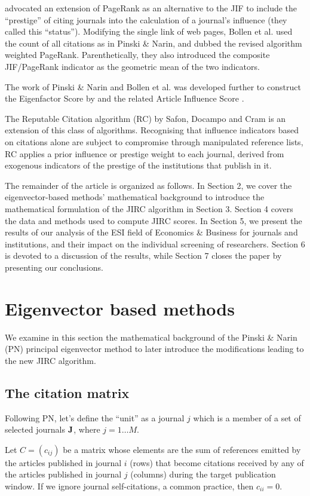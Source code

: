 \documentclass[10pt]{article}
\begin{document}
\cite{bollen} advocated an extension of PageRank as an alternative to
the JIF to include the “prestige” of citing journals into the calculation of a journal’s
influence (they called this “status”). Modifying the single link of web pages, Bollen et al.
used the count of all citations as in Pinski \& Narin, and dubbed the revised algorithm
weighted PageRank. Parenthetically, they also introduced the composite JIF/PageRank
indicator as the geometric mean of the two indicators.

The work of Pinski \& Narin and Bollen et al. was developed further to construct the
Eigenfactor Score by \cite{bergstrom} and the related Article Influence Score \cite{franceschet}.

The Reputable Citation algorithm (RC) by Safon, Docampo and Cram \citep{safon2025}  is an extension of this class of algorithms. Recognising that influence indicators based on citations alone are subject to compromise
through manipulated reference lists, RC applies a prior influence or prestige weight
to each journal, derived from exogenous indicators of the prestige of the institutions
that publish in it.

The remainder of the article is organized as follows. In Section 2, we cover the eigenvector-based methods' mathematical background to introduce the mathematical formulation of the JIRC algorithm in Section 3. Section 4 covers the data and methods used to compute JIRC scores. In Section 5, we present the results of our analysis of the ESI field of Economics \& Business for journals and institutions, and their impact on the individual screening of researchers. Section 6 is devoted to a discussion of the results, while Section 7 closes the paper by presenting our conclusions.

\section{Eigenvector based methods}
We examine in this section the mathematical background of the Pinski \& Narin (PN) principal eigenvector method to later introduce the modifications leading to the new JIRC algorithm.
\subsection{The citation matrix}
Following PN, let's define the ``unit'' as a journal $j$ which is a member of a set of selected
journals $\bf{J}$, where $j = 1 \ldots M$.

Let $C = (c_{ij})$ be a matrix whose elements are the sum of references emitted by
the articles published in journal $i$ (rows) that become citations received by any of the articles published in journal $j$ (columns) during the target
publication window. If we ignore journal self-citations, a common practice, then $c_{ii} = 0$.
\end{document}
